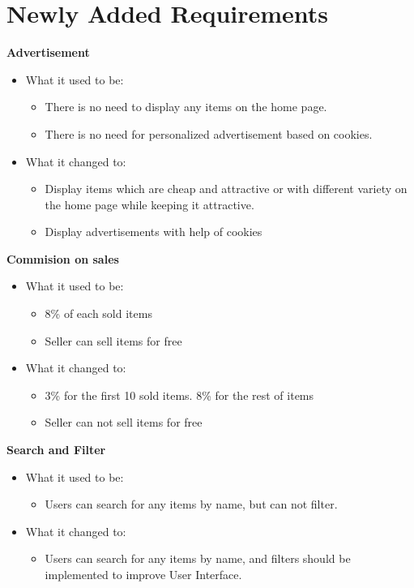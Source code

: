 \documentclass[11pt]{article}
\newcounter{use case ID}
\begin{document}
\section{Newly Added Requirements}
\textbf{Advertisement} \\
\begin{itemize}
    \item What it used to be:
        \begin{itemize}
            \item There is no need to display any items on the home page.
            \item There is no need for personalized advertisement based on cookies.
        \end{itemize}
    \item What it changed to:
        \begin{itemize}
            \item Display items which are cheap and attractive or with different variety on the home page while keeping it attractive.
            \item Display advertisements with help of cookies
        \end{itemize}
\end{itemize}
\textbf{Commision on sales} \\
\begin{itemize}
    \item What it used to be:
        \begin{itemize}
            \item 8\% of each sold items
            \item Seller can sell items for free
        \end{itemize}
    \item What it changed to:
        \begin{itemize}
            \item 3\% for the first 10 sold items. 8\% for the rest of items
            \item Seller can not sell items for free
        \end{itemize}
\end{itemize}
\textbf{Search and Filter} \\
\begin{itemize}
    \item What it used to be:
        \begin{itemize}
            \item Users can search for any items by name, but can not filter.
        \end{itemize}
    \item What it changed to:
        \begin{itemize}
            \item Users can search for any items by name, and filters should be implemented to improve User Interface.
        \end{itemize}
\end{itemize}
\end{document}
